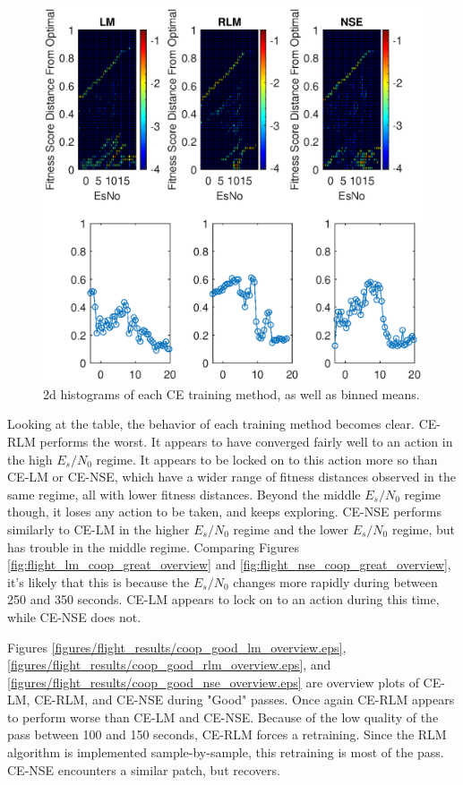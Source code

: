 \begin{figure}[ht]
\centering
\includegraphics[width=\textwidth]{figures/flight_results/coop_great_2dhist.eps}
\caption{2d histograms of each CE training method, as well as binned means.}
\label{fig:coop_great_2dhist}
\end{figure}
\par Looking at the table, the behavior of each training method becomes clear. CE-RLM performs the worst. It appears to have converged fairly well to an action in the high $E_s/N_0$ regime. It appears to be locked on to this action more so than CE-LM or CE-NSE, which have a wider range of fitness distances observed in the same regime, all with lower fitness distances. Beyond the middle $E_s/N_0$ regime though, it loses any action to be taken, and keeps exploring. CE-NSE performs similarly to CE-LM in the higher $E_s/N_0$ regime and the lower $E_s/N_0$ regime, but has trouble in the middle regime. Comparing Figures \ref{fig:flight_lm_coop_great_overview} and \ref{fig:flight_nse_coop_great_overview}, it's likely that this is because the $E_s/N_0$ changes more rapidly during between 250 and 350 seconds. CE-LM appears to lock on to an action during this time, while CE-NSE does not. 


\par Figures \ref{figures/flight_results/coop_good_lm_overview.eps}, \ref{figures/flight_results/coop_good_rlm_overview.eps}, and \ref{figures/flight_results/coop_good_nse_overview.eps} are overview plots of CE-LM, CE-RLM, and CE-NSE during "Good" passes. Once again CE-RLM appears to perform worse than CE-LM and CE-NSE. Because of the low quality of the pass between 100 and 150 seconds, CE-RLM forces a retraining. Since the RLM algorithm is implemented sample-by-sample, this retraining is most of the pass. CE-NSE encounters a similar patch, but recovers. 

